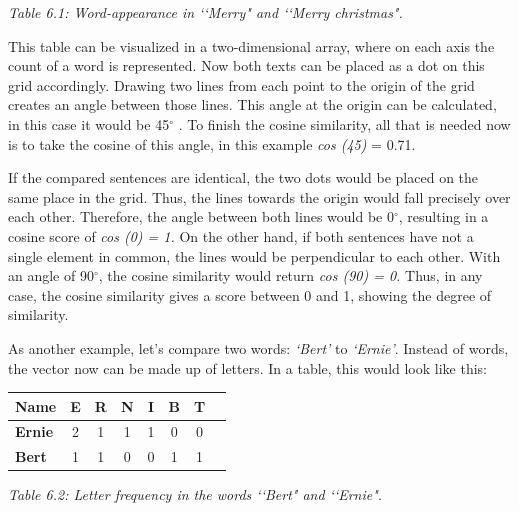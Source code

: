 \begin{center}

{\it \footnotesize Table 6.1: Word-appearance in \lq\lq Merry" and \lq\lq Merry christmas".}
\end{center}
\vspace{0.3cm}

 \noindent This table can be visualized in a two-dimensional array, where on each axis the count of a word is represented. Now both texts can be placed as a dot on this grid accordingly. Drawing two lines from each point to the origin of the grid creates an angle between those lines. This angle at the origin can be calculated, in this case it would be 45$^{\circ}$ . To finish the cosine similarity, all that is needed now is to take the cosine of this angle, in this example \textit{cos (45)} = 0.71. 



If the compared sentences are identical, the two dots would be placed on the same place in the grid. Thus, the lines towards the origin would fall precisely over each other. Therefore, the angle between both lines would be 0$^{\circ}$, resulting in a cosine score of \textit{cos (0) = 1.} On the other hand, if both sentences have not a single element in common, the lines would be perpendicular to each other. With an angle of 90$^{\circ}$, the cosine similarity would return \textit{cos (90) = 0.} Thus, in any case, the cosine similarity gives a score between 0 and 1, showing the degree of similarity. 

As another example, let’s compare two words: \textit{‘Bert’} to \textit{‘Ernie’}. Instead of words, the vector now can be made up of letters. In a table, this would look like this:

\begin{center}
\begin{tabular}{|l|c|c|c|c|c|c|c|}
\hline
{\bf Name} & {\bf E} & {\bf R} & {\bf N} & {\bf I} & {\bf B} & {\bf T} \\
\hline
{\bf Ernie} & 2 & 1 & 1 & 1 & 0 & 0\\
{\bf Bert} & 1 & 1 & 0 & 0  & 1 & 1 \\
\hline
\end{tabular}

{\it \footnotesize Table 6.2: Letter frequency in the words \lq\lq Bert" and \lq\lq Ernie".}
\end{center}

